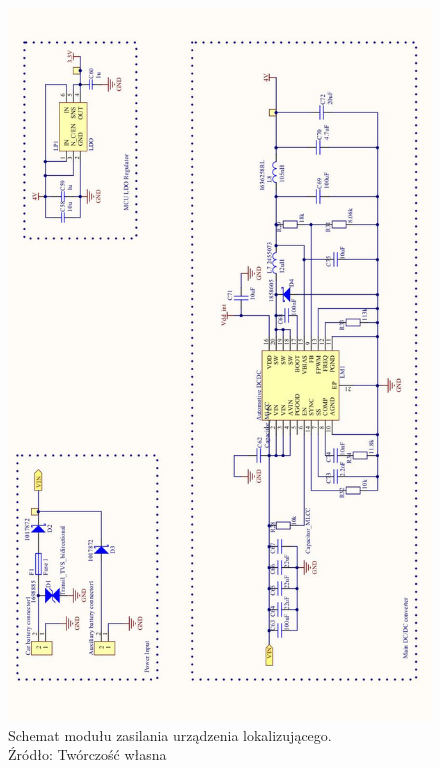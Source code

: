 \begin{figure}[H]
	\centering
	\includegraphics[width=13cm]{img/schematics/mainboard_power.jpg}
	\caption{Schemat modułu zasilania urządzenia lokalizującego. \\ Źródło: Twórczość własna}
	\label{fig:image_mainboard_power_schematic}
\end{figure}

